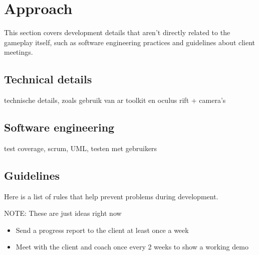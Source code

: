 \section{Approach}

This section covers development details that aren't directly related to the
gameplay itself, such as software engineering practices and guidelines about
client meetings.

\subsection{Technical details}

technische details, zoals gebruik van ar toolkit en oculus rift + camera's

\subsection{Software engineering}

test coverage, scrum, UML, testen met gebruikers

\subsection{Guidelines}

Here is a list of rules that help prevent problems during development.

{\color{red} NOTE: These are just ideas right now}

\begin{itemize}
	\item Send a progress report to the client at least once a week
	\item Meet with the client and coach once every 2 weeks to show a working demo
\end{itemize}